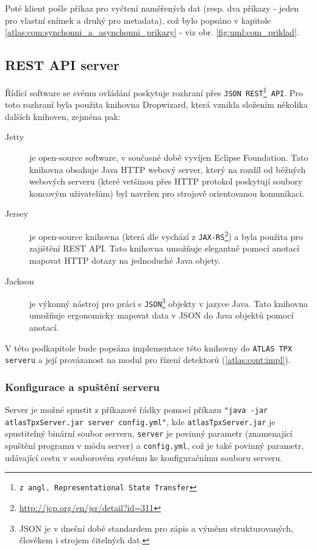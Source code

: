 Poté klient pošle příkaz pro vyčtení naměřených dat (resp. dva příkazy - jeden pro vlastní snímek a druhý pro metadata), což bylo popsáno v kapitole \ref{atlas:com:synchonni_a_asynchonni_prikazy} - viz obr. \ref{fig:uml:com_priklad}.

\subsection{REST API server}\label{atlas:cont:api}
Řídící software se svému ovládání poskytuje rozhraní přes \texttt{JSON REST\footnote{z angl. Representational State Transfer} API}. Pro toto rozhraní byla použita knihovna Dropwizard\cite{dropwizard}, která vznikla složením několika dalších knihoven, zejména pak:
\begin{description}
	\item[Jetty] je open-source software, v současné době vyvíjen Eclipse Foundation. Tato knihovna obsahuje Java HTTP webový server, který na rozdíl od běžných webových serveru (které vetšinou přes HTTP protokol poskytují soubory koncovým uživatelům) byl navržen pro strojově orientovanou komunikaci.
	\item[Jersey] je open-source knihovna (která dle \cite{dropwizard} vychází z \texttt{JAX-RS}\footnote{\url{http://jcp.org/en/jsr/detail?id=311}}) a byla použita pro zajištění REST API. Tato knihovna umožňuje elegantně pomocí anotací mapovat HTTP dotazy na jednoduché Java objety.
	\item[Jackson] je výkonný nástroj pro práci s \texttt{JSON}\footnote{JSON je v dnešní době standardem pro zápis a výměnu strukturovaných, člověkem i strojem čitelných dat.} objekty v jazyce Java. Tato knihovna umožňuje ergonomicky mapovat data v JSON do Java objektů pomocí anotací.
\end{description}

V této podkapitole bude popsána implementace této knihovny do \texttt{ATLAS TPX serveru} a její provázanost na modul pro řízení detektorů (\ref{atlas:cont:impl}).

\subsubsection{Konfigurace a spuštění serveru}\label{atlas:cont:api:conf}
Server je možné spustit z příkazové řádky pomocí příkazu \texttt{"java -jar atlasTpxServer.jar server config.yml"}, kde \texttt{atlasTpxServer.jar} je spustitelný binární soubor serveru, \texttt{server} je povinný parametr (znamenající spuštění programu v módu server) a \texttt{config.yml}, což je také povinný parametr, udávající cestu v souborovém systému ke konfiguračnímu souboru serveru.

